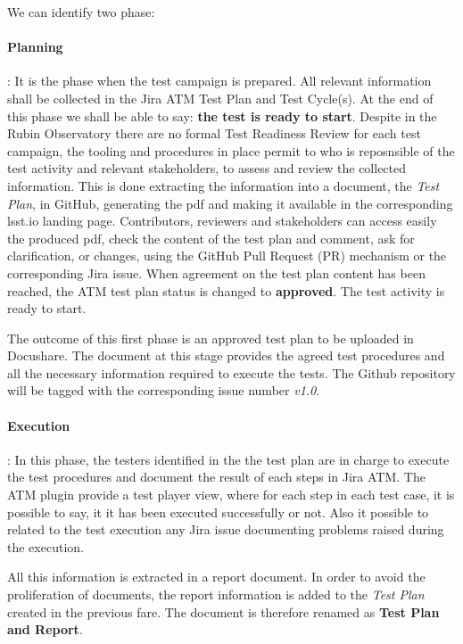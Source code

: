 We can identify two phase:

\paragraph{Planning}:
It is the phase when the test campaign is prepared. All relevant information shall be collected in the Jira ATM Test Plan and 
Test Cycle(s). 
At the end of this phase we shall be able to say: \textbf{the test is ready to start}.
Despite in the Rubin Observatory there are no formal Test Readiness Review for each test campaign, 
the tooling and procedures in place permit to who is reposnsible of the test activity and relevant stakeholders, to assess and review the collected information. 
This is done extracting the information into a document, the \textit{Test Plan}, in GitHub, generating the pdf and making it available
in the corresponding lsst.io landing page. Contributors, reviewers and stakeholders can access easily the produced pdf,
check the content of the test plan and comment, ask for clarification, or changes, using the GitHub
Pull Request (PR) mechanism or the corresponding Jira issue.
When agreement on the test plan content has been reached, the ATM test plan status is changed to \textbf{approved}. The test activity is ready to start.

The outcome of this first phase is an approved test plan to be uploaded in Docushare. 
The document at this stage provides the agreed test procedures and all the necessary information required to execute the tests.
The Github repository will be tagged with the corresponding issue number \textit{v1.0}.

\paragraph{Execution}:
In this phase, the testers identified in the the test plan are in charge to execute the test procedures and 
document the result of each steps in Jira ATM.
The ATM plugin provide a test player view, where for each step in each test case, it is possible to say, it it has been executed successfully or not.
Also it possible to related to the test execution any Jira issue documenting problems raised during the execution.

All this information is extracted in a report document.
In order to avoid the proliferation of documents, the  report information is added to the \textit{Test Plan} created in the previous fare.
The document is therefore renamed as \textbf{Test Plan and Report}.

